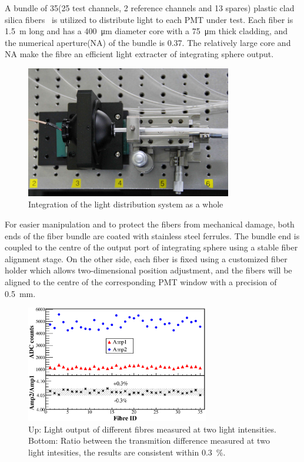 \documentclass[5p, times]{elsarticle}
\begin{document}
A bundle of 35(25 test channels, 2 reference channels and 13 spares) plastic clad silica fibers~\cite{optical_fibre} is utilized to distribute light to each PMT under test.
Each fiber is \SI{1.5}{\meter} long and has a \SI{400}{\micro\meter} diameter core with a \SI{75}{\micro\meter} thick cladding, and the numerical aperture(NA) of the bundle is 0.37.
The relatively large core and NA make the fibre an efficient light extracter of integrating sphere output. 

\begin{figure}
 \centering
 \includegraphics[width=90mm]{light_source1_crop}
\caption{Integration of the light distribution system as a whole}
\label{fig:light_source}
\end{figure} 

For easier manipulation and to protect the fibers from mechanical damage, both ends of the fiber bundle are coated with stainless steel ferrules.
The bundle end is coupled to the centre of the output port of integrating sphere using a stable fiber alignment stage.
On the other side, each fiber is fixed using a customized fiber holder which allows two-dimensional position adjustment, and the fibers will be aligned to the centre of the corresponding PMT window with a precision of \SI{0.5}{\milli\meter}.

\begin{figure}
 \centering
 \includegraphics[width=80mm]{fibre_diff}
\caption{Up: Light output of different fibres measured at two light intensities.
Bottom: Ratio between the transmition difference measured at two light intesities, the results are consistent within \textpm\SI{0.3}{\percent}.}
\label{fig:fibre_diff}
\end{figure} 
\end{document}
